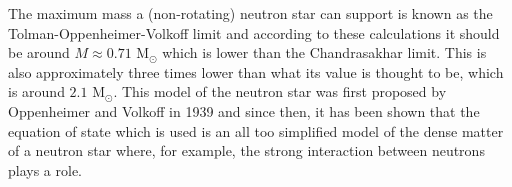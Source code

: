 \documentclass[twocolumn]{article}
\begin{document}
\begin{large}
The maximum mass a (non-rotating) neutron star can support is known as the Tolman-Oppenheimer-Volkoff limit and according to these calculations it should be around $M\approx 0.71$ M$_\odot$ which is lower than the Chandrasakhar limit. This is also approximately three times lower than what its value is thought to be, which is around $2.1$ M$_\odot$. This model of the neutron star was first proposed by Oppenheimer and Volkoff in 1939 and since then, it has been shown that the equation of state which is used is an all too simplified model of the dense matter of a neutron star where, for example, the strong interaction between neutrons plays a role.


\end{large}
\end{document}
